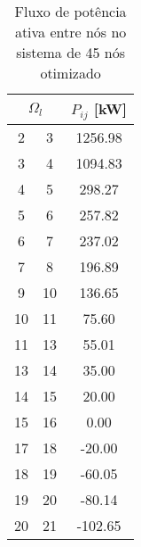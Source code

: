 \begin{table}[H]\footnotesize
    \caption{Fluxo de potência ativa entre nós no sistema de 45 nós otimizado}
    \label{tab:fluxo_kw_otim}
    \begin{minipage}{.5\linewidth}
        \centering
        \begin{tabular}{|c|c|c|}
            \hline
            \multicolumn{2}{|c|}{$\Omega_l$} & $P_{ij}$ [kW]  \\ 
            \hline
            2             & 3             & 1256.98                       \\ 
            \hline
            3             & 4             & 1094.83                       \\ 
            \hline
            4             & 5             & 298.27                        \\ 
            \hline
            5             & 6             & 257.82                        \\ 
            \hline
            6             & 7             & 237.02                        \\ 
            \hline
            7             & 8             & 196.89                        \\ 
            \hline
            9             & 10            & 136.65                        \\ 
            \hline
            10            & 11            & 75.60                         \\ 
            \hline
            11            & 13            & 55.01                         \\ 
            \hline
            13            & 14            & 35.00                         \\ 
            \hline
            14            & 15            & 20.00                         \\ 
            \hline
            15            & 16            & 0.00                          \\ 
            \hline
            17            & 18            & -20.00                        \\ 
            \hline
            18            & 19            & -60.05                        \\ 
            \hline
            19            & 20            & -80.14                        \\ 
            \hline
            20            & 21            & -102.65                       \\ 

\end{tabular}
\end{minipage}
\end{table}
